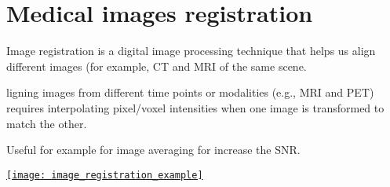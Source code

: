\chapter{Medical images registration}

Image registration is a digital image processing technique that helps us align different images (for example, \gls{CT} and \gls{MRI} of the same scene.

ligning images from different time points or modalities (e.g., MRI and PET) requires interpolating pixel/voxel intensities when one image is transformed to match the other.

Useful for example for image averaging for increase the SNR.


\begin{center}
  \href{https://3dqlab.stanford.edu/image-registration/}{\texttt{[image: image\_registration\_example]}}
\end{center}



